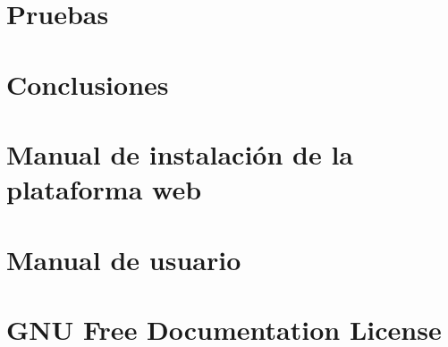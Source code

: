 \documentclass[a4paper, 12pt]{book}
\begin{document}
\chapter{Pruebas}
\label{chap:pruebas}


\chapter{Conclusiones}
\label{chap:conclusiones}


\appendix

\chapter{Manual de instalación de la plataforma web}
\label{chap:manual_instalacion}


\chapter{Manual de usuario}
\label{chap:manual_usuario}


\chapter{GNU Free Documentation License}
\label{sec:fdl}




\end{document}
